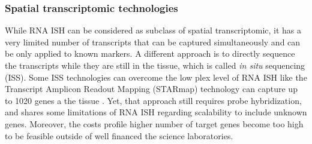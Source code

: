 \subsubsection{Spatial transcriptomic technologies}
While RNA ISH can be considered as subclass of spatial transcriptomic, it has a very limited number of transcripts that can be captured simultaneously and can be only applied to known markers. A different approach is to directly sequence the transcripts while they are still in the tissue, which is called \textit{in situ} sequencing (ISS). Some ISS technologies can overcome the low plex level of RNA ISH like the Transcript Amplicon Readout Mapping (STARmap) technology can capture up to 1020 genes a the tissue \cite{wang2018three}. Yet, that approach still requires probe hybridization, and shares some limitations of RNA ISH \cite{ke2013situ,hernandez2019mapping,chen2018efficient} regarding scalability to include unknown genes. Moreover, the costs profile higher number of target genes become too high to be feasible outside of well financed the science laboratories.

